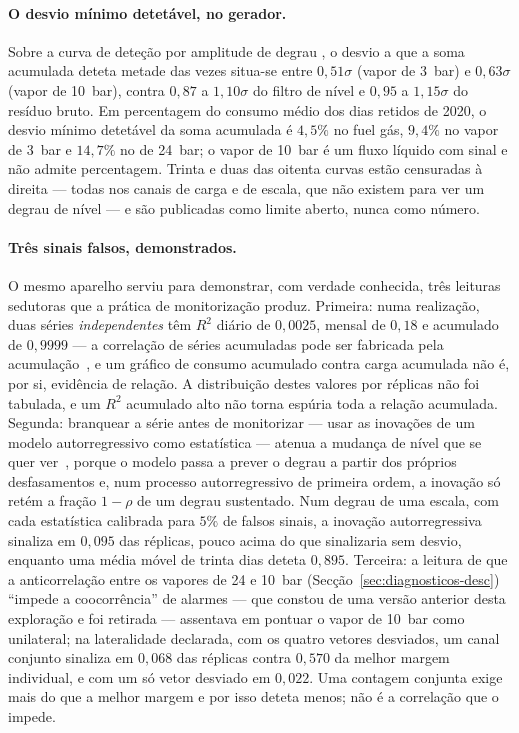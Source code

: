 \paragraph{O desvio mínimo detetável, no gerador.} Sobre a curva de deteção
por amplitude de degrau , o desvio a que a soma acumulada deteta metade das
vezes situa-se entre $0{,}51\sigma$ (vapor de 3~bar) e $0{,}63\sigma$ (vapor
de 10~bar), contra $0{,}87$ a $1{,}10\sigma$ do filtro de nível e $0{,}95$ a
$1{,}15\sigma$ do resíduo bruto. Em percentagem do consumo médio dos dias
retidos de 2020, o desvio mínimo detetável da soma acumulada é $4{,}5\%$ no
fuel gás, $9{,}4\%$ no vapor de 3~bar e $14{,}7\%$ no de 24~bar; o vapor de
10~bar é um fluxo líquido com sinal e não admite percentagem. Trinta e duas
das oitenta curvas estão censuradas à direita --- todas nos canais de carga e
de escala, que não existem para ver um degrau de nível --- e são publicadas
como limite aberto, nunca como número. 

\paragraph{Três sinais falsos, demonstrados.} O mesmo aparelho serviu para
demonstrar, com verdade conhecida, três leituras sedutoras que a prática de
monitorização produz. Primeira: numa realização, duas séries \emph{independentes} têm
$R^2$ diário de $0{,}0025$, mensal de $0{,}18$ e acumulado de $0{,}9999$ ---
a correlação de séries acumuladas pode ser fabricada pela
acumulação~\cite{Yule1926,GrangerNewbold1974}, e um gráfico de consumo
acumulado contra carga acumulada não é, por si, evidência de relação. A
distribuição destes valores por réplicas não foi tabulada, e um $R^2$
acumulado alto não torna espúria toda a relação acumulada. Segunda: branquear a série antes de monitorizar --- usar as
inovações de um modelo autorregressivo como estatística --- atenua a mudança
de nível que se quer ver~\cite{AlwanRoberts1988,Wardell1994}, porque o
modelo passa a prever o degrau a partir dos próprios desfasamentos e, num
processo autorregressivo de primeira ordem, a inovação só retém a fração
$1-\rho$ de um degrau sustentado. Num degrau de uma escala, com cada
estatística calibrada para $5\%$ de falsos sinais, a inovação
autorregressiva sinaliza em $0{,}095$ das réplicas, pouco acima do que
sinalizaria sem desvio, enquanto uma média móvel de trinta dias deteta
$0{,}895$. Terceira: a leitura de que a
anticorrelação entre os vapores de 24 e 10~bar
(Secção~\ref{sec:diagnosticos-desc}) ``impede a coocorrência'' de alarmes ---
que constou de uma versão anterior desta exploração e foi retirada ---
assentava em pontuar o vapor de 10~bar como unilateral; na lateralidade
declarada, com os quatro vetores desviados, um canal conjunto sinaliza em
$0{,}068$ das réplicas contra $0{,}570$ da melhor margem individual, e com um
só vetor desviado em $0{,}022$. Uma contagem conjunta exige mais do que a
melhor margem e por isso deteta menos; não é a correlação que o impede.

